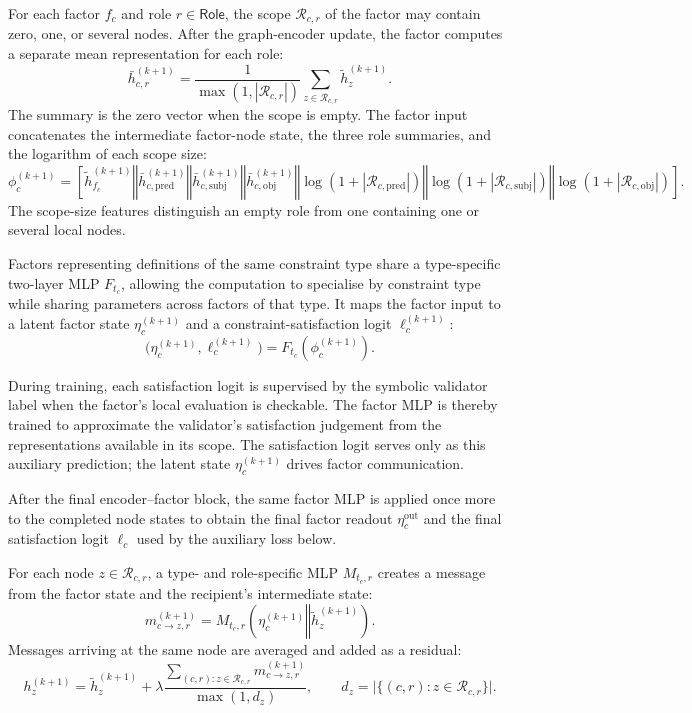 \documentclass[a4paper,UKenglish,cleveref,autoref,thm-restate]{tgdk-v2021}
\begin{document}
For each factor \(f_c\) and role \(r\in\mathsf{Role}\), the scope \(\mathcal{R}_{c,r}\) of the factor may contain zero, one, or several nodes. After the graph-encoder update, the factor computes a separate mean representation for each role:
\[
\bar h_{c,r}^{(k+1)}=\frac{1}{\max(1,|\mathcal{R}_{c,r}|)}\sum_{z\in\mathcal{R}_{c,r}}\widetilde h_z^{(k+1)}.
\]
The summary is the zero vector when the scope is empty. The factor input concatenates the intermediate factor-node state, the three role summaries, and the logarithm of each scope size:
\[
\phi_c^{(k+1)}=\left[\widetilde h_{f_c}^{(k+1)}\mathbin\Vert\bar h_{c,\mathrm{pred}}^{(k+1)}\mathbin\Vert\bar h_{c,\mathrm{subj}}^{(k+1)}\mathbin\Vert\bar h_{c,\mathrm{obj}}^{(k+1)}\mathbin\Vert\log(1+|\mathcal{R}_{c,\mathrm{pred}}|)\mathbin\Vert\log(1+|\mathcal{R}_{c,\mathrm{subj}}|)\mathbin\Vert\log(1+|\mathcal{R}_{c,\mathrm{obj}}|)\right].
\]
The scope-size features distinguish an empty role from one containing one or several local nodes.

Factors representing definitions of the same constraint type share a type-specific two-layer MLP \(F_{t_c}\), allowing the computation to specialise by constraint type while sharing parameters across factors of that type. It maps the factor input to a latent factor state \(\eta_c^{(k+1)}\) and a constraint-satisfaction logit \(\ell_c^{(k+1)}\):
\[
\bigl(\eta_c^{(k+1)},\ell_c^{(k+1)}\bigr)=F_{t_c}\left(\phi_c^{(k+1)}\right).
\]

During training, each satisfaction logit is supervised by the symbolic validator label when the factor's local evaluation is checkable. The factor MLP is thereby trained to approximate the validator's satisfaction judgement from the representations available in its scope. The satisfaction logit serves only as this auxiliary prediction; the latent state \(\eta_c^{(k+1)}\) drives factor communication.

After the final encoder--factor block, the same factor MLP is applied once more to the completed node states to obtain the final factor readout \(\eta_c^{\mathrm{out}}\) and the final satisfaction logit \(\ell_c\) used by the auxiliary loss below.

For each node \(z\in\mathcal{R}_{c,r}\), a type- and role-specific MLP \(M_{t_c,r}\) creates a message from the factor state and the recipient's intermediate state:
\[
m_{c\to z,r}^{(k+1)}=M_{t_c,r}\left(\eta_c^{(k+1)}\mathbin\Vert\widetilde h_z^{(k+1)}\right).
\]
Messages arriving at the same node are averaged and added as a residual:
\[
h_z^{(k+1)}=\widetilde h_z^{(k+1)}+\lambda\frac{\displaystyle\sum_{(c,r):z\in\mathcal{R}_{c,r}}m_{c\to z,r}^{(k+1)}}{\max(1,d_z)},
\qquad
d_z=\bigl|\{(c,r):z\in\mathcal{R}_{c,r}\}\bigr|.
\]
\end{document}
